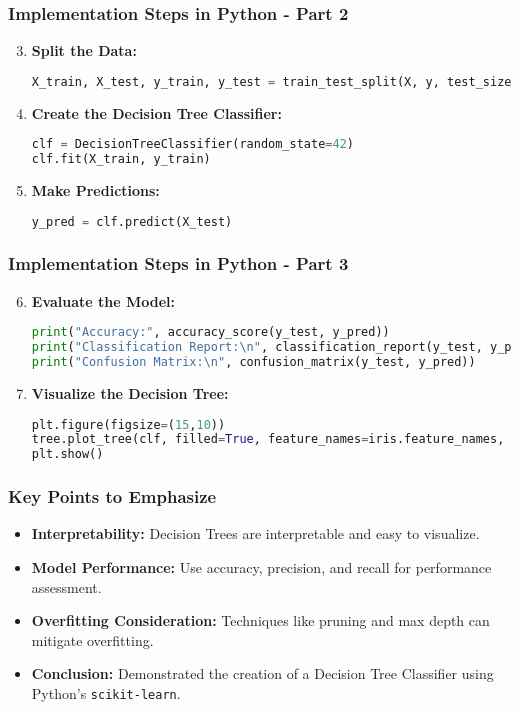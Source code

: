 \documentclass[aspectratio=169]{beamer}
\begin{document}
\begin{frame}[fragile]
    \frametitle{Implementation Steps in Python - Part 2}
    \begin{enumerate}
        \setcounter{enumi}{2}
        \item \textbf{Split the Data:}
        \begin{lstlisting}[language=Python]
X_train, X_test, y_train, y_test = train_test_split(X, y, test_size=0.3, random_state=42)
        \end{lstlisting}
        \item \textbf{Create the Decision Tree Classifier:}
        \begin{lstlisting}[language=Python]
clf = DecisionTreeClassifier(random_state=42)
clf.fit(X_train, y_train)
        \end{lstlisting}
        \item \textbf{Make Predictions:}
        \begin{lstlisting}[language=Python]
y_pred = clf.predict(X_test)
        \end{lstlisting}
    \end{enumerate}
\end{frame}

\begin{frame}[fragile]
    \frametitle{Implementation Steps in Python - Part 3}
    \begin{enumerate}
        \setcounter{enumi}{5}
        \item \textbf{Evaluate the Model:}
        \begin{lstlisting}[language=Python]
print("Accuracy:", accuracy_score(y_test, y_pred))
print("Classification Report:\n", classification_report(y_test, y_pred))
print("Confusion Matrix:\n", confusion_matrix(y_test, y_pred))
        \end{lstlisting}
        \item \textbf{Visualize the Decision Tree:}
        \begin{lstlisting}[language=Python]
plt.figure(figsize=(15,10))
tree.plot_tree(clf, filled=True, feature_names=iris.feature_names, class_names=iris.target_names)
plt.show()
        \end{lstlisting}
    \end{enumerate}
\end{frame}

\begin{frame}
    \frametitle{Key Points to Emphasize}
    \begin{itemize}
        \item \textbf{Interpretability:} Decision Trees are interpretable and easy to visualize.
        \item \textbf{Model Performance:} Use accuracy, precision, and recall for performance assessment.
        \item \textbf{Overfitting Consideration:} Techniques like pruning and max depth can mitigate overfitting.
        \item \textbf{Conclusion:} Demonstrated the creation of a Decision Tree Classifier using Python's \texttt{scikit-learn}.
    \end{itemize}
\end{frame}
\end{document}
